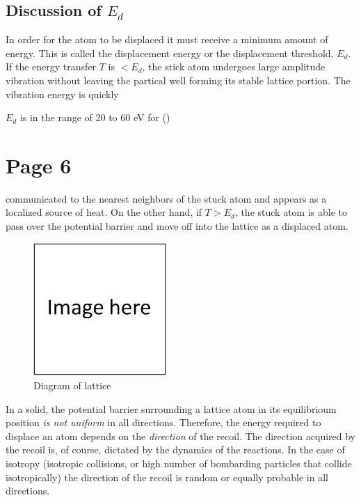 \documentclass[11pt]{article}
\begin{document}
\subsection{Discussion of \texorpdfstring{$E_d$}{}}
In order for the atom to be displaced it must receive a minimum amount of energy. This is called the displacement energy or the displacement threshold, $E_d$. If the energy transfer $T$ is $<E_d$, the stick atom undergoes large amplitude vibration without leaving the partical well forming its stable lattice portion. The vibration energy is quickly

$E_d$ is in the range of 20 to 60 eV for ()

\section{Page 6}
communicated to the nearest neighbors of the stuck atom and appears as a localized source of heat. On the other hand, if $T>E_d$, the stuck atom is able to pass over the potential barrier and move off into the lattice as a displaced atom.

\begin{figure}
  \begin{center}
  \includegraphics[width=0.45\textwidth]{figs/fillImage.png}
  \end{center}
  \caption{Diagram of lattice}
\end{figure}

In a solid, the potential barrier surrounding a lattice atom in its equilibrioum position \textit{is not uniform} in all directions. Therefore, the energy required to displace an atom depends on the \textit{direction} of the recoil. The direction acquired by the recoil is, of course, dictated by the dynamics of the reactions. In the case of isotropy (isotropic collisions, or high number of bombarding particles that collide isotropically) the direction of the recoil is random or equally probable in all directions.
\end{document}
